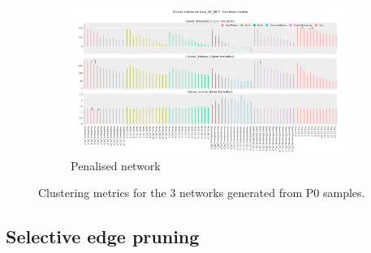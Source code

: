 \begin{figure}[!htb]
\begin{subfigure}{0.49\linewidth}
        \includegraphics[width=1.0\textwidth,keepaspectratio]{Sections/Network_I/Resources/P0/CA_metrics_pen_tum_4k_v3.png}
        \caption{Penalised network}
    \end{subfigure}
    \caption{Clustering metrics for the 3 networks generated from P0 samples.}
    \label{fig:ap:p0_choosing_cs}
\end{figure}


\subsection{Selective edge pruning} \label{s:ap:sel_prun}

